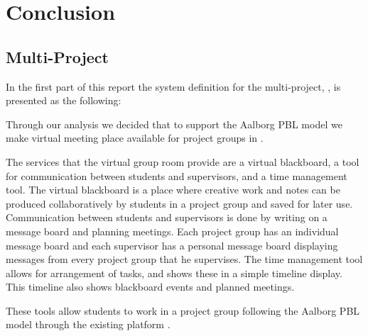 \chapter{Conclusion}
\label{chap:conclusion}
\section{Multi-Project}
\label{sec:multiconclusion}
In the first part of this report the system definition for the multi-project, \system{}, is presented as the following: 



Through our analysis we decided that to support the Aalborg PBL model we make virtual meeting place available for project groups in \moodle{}.

The services that the virtual group room provide are a virtual blackboard, a tool for communication between students and supervisors, and a time management tool.
The virtual blackboard is a place where creative work and notes can be produced collaboratively by students in a project group and saved for later use.
Communication between students and supervisors is done by writing on a message board and planning meetings.
Each project group has an individual message board and each supervisor has a personal message board displaying messages from every project group that he supervises.
The time management tool allows for arrangement of tasks, and shows these in a simple timeline display.
This timeline also shows blackboard events and planned meetings.

These tools allow students to work in a project group following the Aalborg PBL model through the existing platform \moodle{}.

